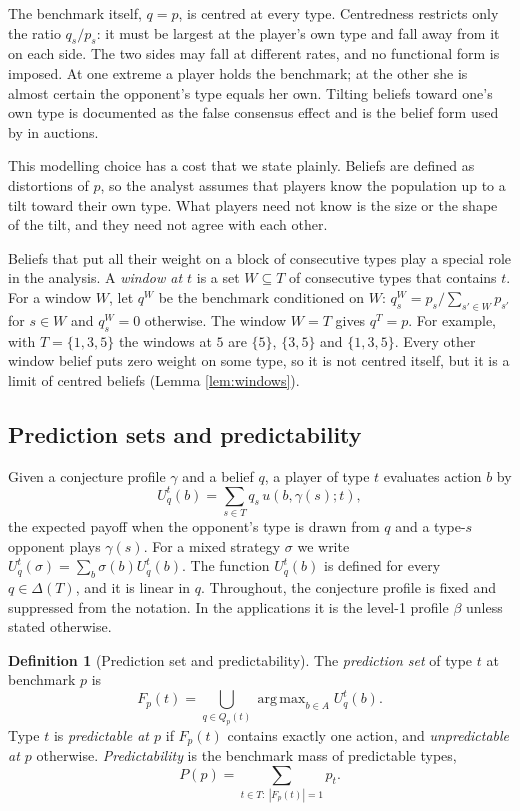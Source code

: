\documentclass[12pt]{article}
\theoremstyle{definition}
\newtheorem{definition}{Definition}
\DeclareMathOperator*{\argmax}{arg\,max}
\begin{document}
The benchmark itself, $q = p$, is centred at every type. Centredness restricts only the ratio $q_s/p_s$: it must be largest at the player's own type and fall away from it on each side. The two sides may fall at different rates, and no functional form is imposed. At one extreme a player holds the benchmark; at the other she is almost certain the opponent's type equals her own. Tilting beliefs toward one's own type is documented as the false consensus effect \citep{ross1977false} and is the belief form used by \citet{gpr2021projection} in auctions.

This modelling choice has a cost that we state plainly. Beliefs are defined as distortions of $p$, so the analyst assumes that players know the population up to a tilt toward their own type. What players need not know is the size or the shape of the tilt, and they need not agree with each other.

Beliefs that put all their weight on a block of consecutive types play a special role in the analysis. A \emph{window at $t$} is a set $W \subseteq T$ of consecutive types that contains $t$. For a window $W$, let $q^W$ be the benchmark conditioned on $W$: $q^W_s = p_s / \sum_{s' \in W} p_{s'}$ for $s \in W$ and $q^W_s = 0$ otherwise. The window $W = T$ gives $q^T = p$. For example, with $T = \{1, 3, 5\}$ the windows at $5$ are $\{5\}$, $\{3, 5\}$ and $\{1,3,5\}$. Every other window belief puts zero weight on some type, so it is not centred itself, but it is a limit of centred beliefs (Lemma \ref{lem:windows}).

\subsection{Prediction sets and predictability}

Given a conjecture profile $\gamma$ and a belief $q$, a player of type $t$ evaluates action $b$ by
\[
U^t_q(b) = \sum_{s \in T} q_s \, u(b, \gamma(s); t),
\]
the expected payoff when the opponent's type is drawn from $q$ and a type-$s$ opponent plays $\gamma(s)$. For a mixed strategy $\sigma$ we write $U^t_q(\sigma) = \sum_b \sigma(b) U^t_q(b)$. The function $U^t_q(b)$ is defined for every $q \in \Delta(T)$, and it is linear in $q$. Throughout, the conjecture profile is fixed and suppressed from the notation. In the applications it is the level-1 profile $\beta$ unless stated otherwise.

\begin{definition}[Prediction set and predictability]\label{def:predset}
The \emph{prediction set} of type $t$ at benchmark $p$ is
\[
F_p(t) = \bigcup_{q \in Q_p(t)} \argmax_{b \in A} U^t_q(b).
\]
Type $t$ is \emph{predictable at $p$} if $F_p(t)$ contains exactly one action, and \emph{unpredictable at $p$} otherwise. \emph{Predictability} is the benchmark mass of predictable types,
\[
P(p) = \sum_{t \in T:\ |F_p(t)| = 1} p_t .
\]
\end{definition}
\end{document}
